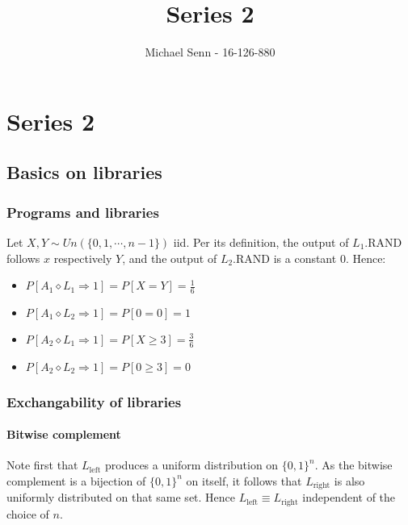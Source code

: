 \documentclass[a4paper]{scrreprt}
\title{Series 2}
\author{Michael Senn \maillink{michael.senn@students.unibe.ch} - 16-126-880}
\date{\printdate}
\begin{document}
\maketitle


\setcounter{chapter}{1}
\chapter{Series 2}

\section{Basics on libraries}

\subsection{Programs and libraries}

Let $X, Y \sim Un(\{0, 1, \cdots, n-1\})$ iid. Per its definition, the output
of $L_1.\text{RAND}$ follows $x$ respectively $Y$, and the output of $L_2.\text{RAND}$ is a constant
$0$. Hence:

\begin{itemize}
	\item $P[A_1 \diamond L_1 \Rightarrow 1] = P[X = Y] = \frac{1}{6}$
	\item $P[A_1 \diamond L_2 \Rightarrow 1] = P[0 = 0] = 1$
	\item $P[A_2 \diamond L_1 \Rightarrow 1] = P[X \geq 3] = \frac{3}{6}$
	\item $P[A_2 \diamond L_2 \Rightarrow 1] = P[0 \geq 3] = 0$

\end{itemize}

\subsection{Exchangability of libraries}

\subsubsection{Bitwise complement}

Note first that $L_{\text{left}}$ produces a uniform distribution on $\{0,
1\}^n$. As the bitwise complement is a bijection of $\{0, 1\}^n$ on itself, it
follows that $L_{\text{right}}$ is also uniformly distributed on that same set.
Hence $L_{\text{left}} \equiv L_{\text{right}}$ independent of the choice of
$n$.
\end{document}
